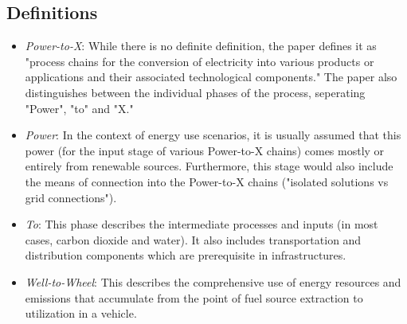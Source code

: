 \documentclass[a4paper]{article}
\begin{document}
\subsection{Definitions}
\begin{itemize}
    \item \textit{Power-to-X}: While there is no definite definition, the paper defines it as "process chains for the conversion of electricity into various products or applications and their associated technological components." The paper also distinguishes between the individual phases of the process, seperating "Power", "to" and "X."
    \item \textit{Power}: In the context of energy use scenarios, it is usually assumed that this power (for the input stage of various Power-to-X chains) comes mostly or entirely from renewable sources. Furthermore, this stage would also include the means of connection into the Power-to-X chains ("isolated solutions vs grid connections").
    \item \textit{To}: This phase describes the intermediate processes and inputs (in most cases, carbon dioxide and water). It also includes transportation and distribution components which are prerequisite in infrastructures.
    \item \textit{Well-to-Wheel}: This describes the comprehensive use of energy resources and emissions that accumulate from the point of fuel source extraction to utilization in a vehicle.
\end{itemize}
\end{document}
